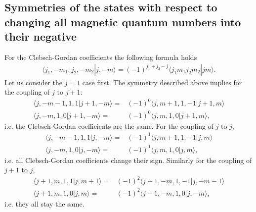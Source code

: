\documentclass[pra,amsfonts,showpacs,preprint,showkeys]{revtex4}
\begin{document}
\subsection{Symmetries of the states with respect to changing
all magnetic quantum numbers into their negative}

For the Clebsch-Gordan coefficients the following formula holds
\begin{align}\langle j_1,-m_1,j_2,-m_2|j,-m\rangle
=(-1)^{j_1+j_2-j}\langle j_1m_1j_2m_2|jm\rangle.\end{align} Let us
consider the $j=1$ case first. The symmetry described above
implies for the coupling of $j$ to $j+1$:
\begin{align}\langle j,-m-1,1,1|j+1,-m\rangle
= &(-1)^{0}\langle j,m+1,1,-1|j+1,m\rangle\nonumber\\
\langle j,-m,1,0|j+1,-m\rangle = &(-1)^{0}\langle
j,m,1,0|j+1,m\rangle,\end{align} i.e. the Clebsch-Gordan
coefficients are the same.
For the coupling of $j$ to $j$,
\begin{align}\langle j,-m-1,1,1|j,-m\rangle
= &(-1)^{1}\langle j,m+1,1,-1|j,m\rangle\nonumber\\
\langle j,-m,1,0|j,-m\rangle = &(-1)^{1}\langle
j,m,1,0|j,m\rangle,\end{align} i.e. all Clebsch-Gordan
coefficients change their sign.
Similarly for the coupling of $j+1$ to $j$,
\begin{align}\langle j+1,m,1,1|j,m+1\rangle
= &(-1)^{2}\langle j+1,-m,1,-1|j,-m-1\rangle\nonumber\\
\langle j+1,m,1,0|j,m\rangle = &(-1)^{2}\langle
j+1,-m,1,0|j,-m\rangle,\end{align} i.e. they all stay the same.
\end{document}
